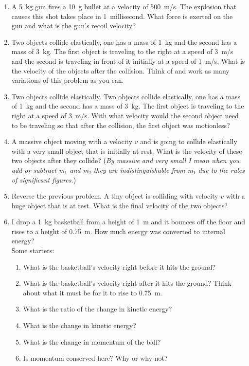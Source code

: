 \documentclass[letterpaper,12pt]{article}
\let\olditem\item
\renewcommand{\item}{\Needspace{6\baselineskip}\olditem}
\newcommand{\giantskip}{\needspace{3in}\vspace{3in}}
\begin{document}
\begin{enumerate}
	
	\item A \SI{5}{kg} gun fires a \SI{10}{\gram} bullet at a velocity of \SI{500}{m/s}. The explosion that causes this shot takes place in \SI{1}{millisecond}. What force is exerted on the gun and what is the gun's recoil velocity?
	
	\item Two objects collide elastically, one has a mass of \SI{1}{kg} and the second has a mass of \SI{3}{kg}. The first object is traveling to the right at a speed of \SI{3}{m/s} and the second is traveling in front of it initially at a speed of \SI{1}{m/s}. What is the velocity of the objects after the collision. Think of and work as many variations of this problem as you can.
	\giantskip
	
	\item Two objects collide elastically. Two objects collide elastically, one has a mass of \SI{1}{kg} and the second has a mass of \SI{3}{kg}. The first object is traveling to the right at a speed of \SI{3}{m/s}. With what velocity would the second object need to be traveling so that after the collision, the first object was motionless?
	
	
	\item
	A massive object moving with a velocity $v$ and is going to collide elastically with a very small object that is initially at rest. What is the velocity of these two objects after they collide? (\emph{By massive and very small I mean when you add or subtract m$_1$ and m$_2$ they are indistinguishable from m$_1$ due to the rules of significant figures.})
	
	\item 
	Reverse the previous problem. A tiny object is colliding with velocity $v$ with a huge object that is at rest. What is the final velocity of the two objects?
	
	\item 
	I drop a \SI{1}{kg} basketball from a height of \SI{1}{\meter} and it bounces off the floor and rises to a height of \SI{0.75}{\meter}. How much energy was converted to internal energy?\\
	Some starters:
	\begin{enumerate}
		\item What is the basketball's velocity right before it hits the ground?
		\item What is the basketball's velocity right after it hits the ground? Think about what it must be for it to rise to \SI{0.75}{\meter}.
		\item What is the ratio of the change in kinetic energy?
		\item What is the change in kinetic energy?
		\item What is the change in momentum of the ball?
		\item Is momentum conserved here? Why or why not?
	\end{enumerate}
	

\end{enumerate}
\end{document}
